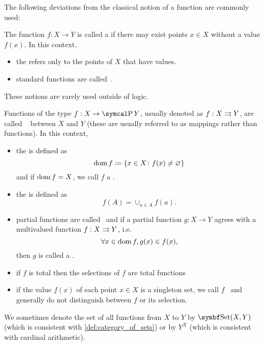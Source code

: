 \begin{definition}
  The following deviations from the classical notion of a function are commonly used:
  \begin{itemize}
     The function \( f: X \to Y \) is called a if there may exist points \( x \in X \) without a value \( f(x) \). In this context,
    \begin{itemize}
      \item the  refers only to the points of \( X \) that have values.
      \item standard functions are called~.
    \end{itemize}

    These notions are rarely used outside of logic.

     Functions of the type \( f: X \to \Power Y \), usually denoted as \( f: X \rightrightarrows Y \), are called ~ between \( X \) and \( Y \) (these are usually referred to as mappings rather than functions). In this context,
    \begin{itemize}
      \item the  is defined as
      \begin{equation*}
        \operatorname{dom} f \coloneqq \{ x \in X \colon f(x) \neq \varnothing \}
      \end{equation*}
      and if \( \operatorname{dom} f = X \), we call \( f \) a .

      \item the  is defined as
      \begin{equation*}
        f(A) = \cup_{a \in A} f(a).
      \end{equation*}

      \item partial functions are called~ and if a partial function \( g: X \to Y \) agrees with a multivalued function \( f: X \rightrightarrows Y \), i.e.
      \begin{equation*}
        \forall x \in \operatorname{dom} f, g(x) \in f(x),
      \end{equation*}
      then \( g \) is called a .

      \item if \( f \) is total then the selections of \( f \) are total functions

      \item if the value \( f(x) \) of each point \( x \in X \) is a singleton set, we call \( f \)~ and generally do not distinguish between \( f \) or its selection.
    \end{itemize}
  \end{itemize}

  We sometimes denote the set of all functions from \( X \) to \( Y \) by \( \Cat{Set}(X, Y) \) (which is consistent with \cref{def:category_of_sets}) or by \( Y^X \) (which is consistent with cardinal arithmetic).
\end{definition}

